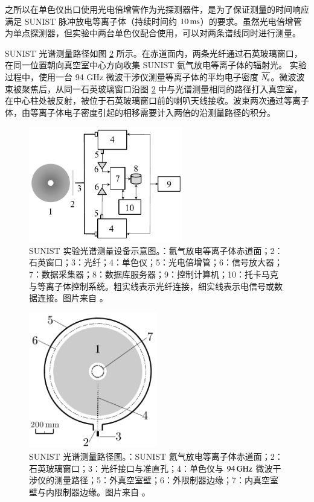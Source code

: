 之所以在单色仪出口使用光电倍增管作为光探测器件，是为了保证测量的时间响应满足 SUNIST 脉冲放电等离子体（持续时间约 $10\,{\rm ms}$）的要求。虽然光电倍增管为单点探测器，但实验中两台单色仪配合使用，可以对两条谱线同时进行测量。

SUNIST 光谱测量路径如图 \ref{fig:chap04:measureing-route} 所示。在赤道面内，两条光纤通过石英玻璃窗口，在同一位置朝向真空室中心方向收集 SUNIST 氦气放电等离子体的辐射光。
实验过程中，使用一台 94 GHz 微波干涉仪测量等离子体的平均电子密度 $\overline{N_{\rm e}}$。微波波束被聚焦后，从同一石英玻璃窗口沿图 \ref{fig:chap04:measureing-route} 中与光谱测量相同的路径打入真空室，在中心柱处被反射，被位于石英玻璃窗口前的喇叭天线接收。波束两次通过等离子体，由等离子体电子密度引起的相移需要计入两倍的沿测量路径的积分。

\begin{figure}[H]
  \centering
  \includegraphics[width=0.6\textwidth]{OESsystem.pdf}
  \caption{SUNIST 实验光谱测量设备示意图。：氦气放电等离子体赤道面；2：石英窗口；3：光纤；4：单色仪；5：光电倍增管；6：信号放大器；7：数据采集器；8：数据库服务器；9：控制计算机；10：托卡马克与等离子体控制系统。粗实线表示光纤连接，细实线表示电信号或数据连接。图片来自 。}
  \label{fig:chap04:OESsystem}
\end{figure}

\begin{figure}[H]
  \centering
  \includegraphics[width=0.5\textwidth]{instru-alignments-2.pdf}
  \caption{SUNIST 光谱测量路径图。：SUNIST 氦气放电等离子体赤道面；2：石英玻璃窗口；3：光纤接口与准直孔；4：单色仪与 $94\,{\rm GHz}$ 微波干涉仪的测量路径；5：外真空室壁；6：外限制器边缘；7：内真空室壁与内限制器边缘。图片来自 。}
  \label{fig:chap04:measureing-route}
\end{figure}


